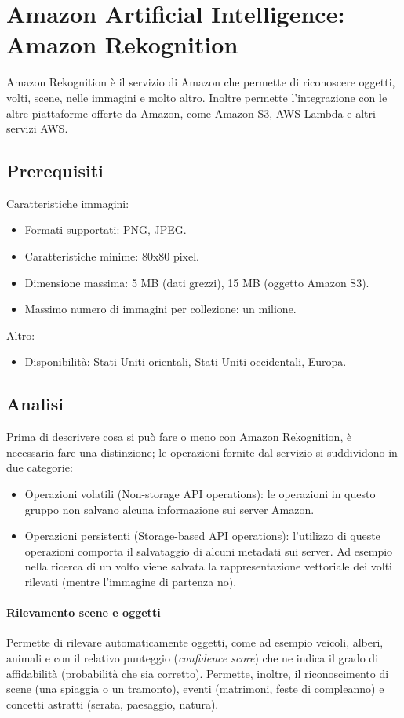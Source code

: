 \section{Amazon Artificial Intelligence: Amazon Rekognition}
Amazon Rekognition \cite{amazon-api} è il servizio di Amazon che permette di riconoscere oggetti, volti, scene, nelle immagini e molto altro.
Inoltre permette l'integrazione con le altre piattaforme offerte da Amazon, come Amazon S3, AWS Lambda e altri servizi AWS.

\subsection{Prerequisiti}
Caratteristiche immagini:
\begin{itemize}
\item Formati supportati: PNG, JPEG.
\item Caratteristiche minime: 80x80 pixel. 
\item Dimensione massima: 5 MB (dati grezzi), 15 MB (oggetto Amazon S3).
\item Massimo numero di immagini per collezione: un milione.
\end{itemize}
Altro:
\begin{itemize}
\item Disponibilità: Stati Uniti orientali, Stati Uniti occidentali, Europa.
\end{itemize}

\subsection{Analisi}
Prima di descrivere cosa si può fare o meno con Amazon Rekognition, è necessaria fare una distinzione; le operazioni fornite dal servizio si suddividono in due categorie:
\begin{itemize}
\item Operazioni volatili (Non-storage API operations): le operazioni in questo gruppo non salvano alcuna informazione sui server Amazon.
\item Operazioni persistenti (Storage-based API operations): l'utilizzo di queste operazioni comporta il salvataggio di alcuni metadati sui server.
Ad esempio nella ricerca di un volto viene salvata la rappresentazione vettoriale dei volti rilevati (mentre l'immagine di partenza no).
\end{itemize}

\paragraph{Rilevamento scene e oggetti} Permette di rilevare automaticamente oggetti, come ad esempio veicoli, alberi, animali e con il relativo punteggio
(\textit{confidence score}) che ne indica il grado di affidabilità (probabilità che sia corretto).
Permette, inoltre, il riconoscimento di scene (una spiaggia o un tramonto), eventi (matrimoni, feste di compleanno) e concetti astratti (serata, paesaggio, natura).

